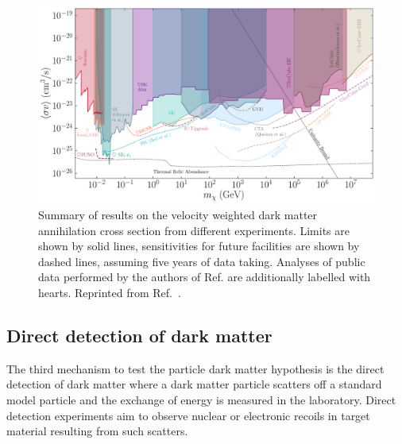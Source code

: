 \begin{figure}
    \centering
    \includegraphics[width=\linewidth]{figures/DMOverview/MainPlot.pdf}
    \caption[Summary of results on the velocity weighted dark matter annihilation cross section from different indirect detection experiments.]{Summary of results on the velocity weighted dark matter annihilation cross section from different experiments. Limits are shown by solid lines, sensitivities for future facilities are shown by dashed lines, assuming five years of data taking. Analyses of public data performed by the authors of Ref.\cite{Arguelles:2019ouk} are additionally labelled with hearts. Reprinted from Ref.~\cite{Arguelles:2019ouk}.}
    \label{fig:DMOverview/DMAnnhillationCrossSection}
\end{figure}

\subsection{Direct detection of dark matter}\label{sec:DMOverview/DirectDetection}
The third mechanism to test the particle dark matter hypothesis is the direct detection of dark matter where a dark matter particle scatters off a standard model particle and the exchange of energy is measured in the laboratory. Direct detection experiments aim to observe nuclear or electronic recoils in target material resulting from such scatters.

